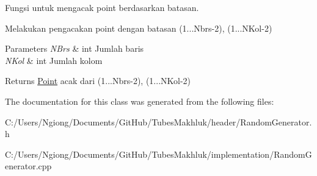 Fungsi untuk mengacak point berdasarkan batasan. 

Melakukan pengacakan point dengan batasan (1...Nbrs-\/2), (1...N\+Kol-\/2) 
\begin{DoxyParams}{Parameters}
{\em N\+Brs} & int Jumlah baris \\
\hline
{\em N\+Kol} & int Jumlah kolom \\
\hline
\end{DoxyParams}
\begin{DoxyReturn}{Returns}
\hyperlink{class_point}{Point} acak dari (1...Nbrs-\/2), (1...N\+Kol-\/2) 
\end{DoxyReturn}


The documentation for this class was generated from the following files\+:\begin{DoxyCompactItemize}
\item 
C\+:/\+Users/\+Ngiong/\+Documents/\+Git\+Hub/\+Tubes\+Makhluk/header/Random\+Generator.\+h\item 
C\+:/\+Users/\+Ngiong/\+Documents/\+Git\+Hub/\+Tubes\+Makhluk/implementation/Random\+Generator.\+cpp\end{DoxyCompactItemize}
